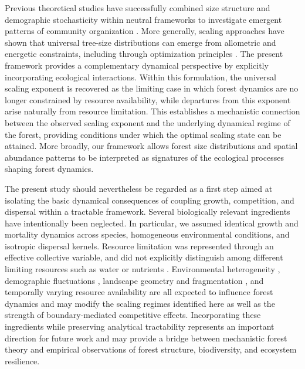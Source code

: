 \documentclass[aps,pre,twocolumn,superscriptaddress,10pt]{revtex4-2}
\begin{document}
Previous theoretical studies have successfully combined size structure and demographic stochasticity within neutral frameworks to investigate emergent patterns of community organization \cite{o2009integrative}. More generally, scaling approaches have shown that universal tree-size distributions can emerge from allometric and energetic constraints, including through optimization principles \cite{simini2010self}. The present framework provides a complementary dynamical perspective by explicitly incorporating ecological interactions. Within this formulation, the universal scaling exponent is recovered as the limiting case in which forest dynamics are no longer constrained by resource availability, while departures from this exponent arise naturally from resource limitation. This establishes a mechanistic connection between the observed scaling exponent and the underlying dynamical regime of the forest, providing conditions under which the optimal scaling state can be attained. More broadly, our framework allows forest size distributions and spatial abundance patterns to be interpreted as signatures of the ecological processes shaping forest dynamics.

The present study should nevertheless be regarded as a first step aimed at isolating the basic dynamical consequences of coupling growth, competition, and dispersal within a tractable framework. Several biologically relevant ingredients have intentionally been neglected. In particular, we assumed identical growth and mortality dynamics across species, homogeneous environmental conditions, and isotropic dispersal kernels. Resource limitation was represented through an effective collective variable, and did not explicitly distinguish among different limiting resources such as water or nutrients \cite{Bloom_1985,Chapin_1987,PoorterKitajima2007,Umarani_2024}. Environmental heterogeneity \cite{chesson2000mechanisms,Melbourne_2008,Padmanabha2024}, demographic fluctuations \cite{o2009integrative,Lande_1993,Bowler2022}, landscape geometry and fragmentation \cite{Laurance_2002,HARPER_2005,Borthagaray_Arim_Marquet2012,BernardiDoimo2026}, and temporally varying resource availability \cite{Wright_2002,Adler_2006,Levine2009,Jops2025} are all expected to influence forest dynamics and may modify the scaling regimes identified here as well as the strength of boundary-mediated competitive effects. Incorporating these ingredients while preserving analytical tractability represents an important direction for future work and may provide a bridge between mechanistic forest theory and empirical observations of forest structure, biodiversity, and ecosystem resilience.
\end{document}
